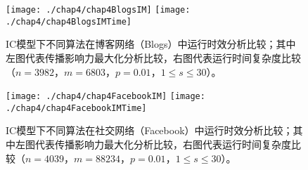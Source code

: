 \begin{figure}[H]
	\centering%
	\subcaptionbox{\label{fig:chap4BlogsIM}}
	{\texttt{[image: ./chap4/chap4BlogsIM]}}
	\subcaptionbox{\label{fig:chap4BlogsIMTime}}
	{\texttt{[image: ./chap4/chap4BlogsIMTime]}}
	\caption{IC模型下不同算法在博客网络（Blogs）中运行时效分析比较；其中左图代表传播影响力最大化分析比较，右图代表运行时间复杂度比较（$n=3982$，$m=6803$，$p=0.01$，$1\leq s\leq 30$）。}
	\label{fig:chap4BlogsIc}
\end{figure}

\begin{figure}[H]
	\centering%
	\subcaptionbox{\label{fig:chap4FacebookIM}}
	{\texttt{[image: ./chap4/chap4FacebookIM]}}
	\subcaptionbox{\label{fig:chap4FacebookIMTime}}
	{\texttt{[image: ./chap4/chap4FacebookIMTime]}}
	\caption{ IC模型下不同算法在社交网络（Facebook）中运行时效分析比较；其中左图代表传播影响力最大化分析比较，右图代表运行时间复杂度比较（$n=4039$，$m=88234$，$p=0.01$，$1\leq s\leq 30$）。}
	\label{fig:chap4FacebookIc}
\end{figure}

